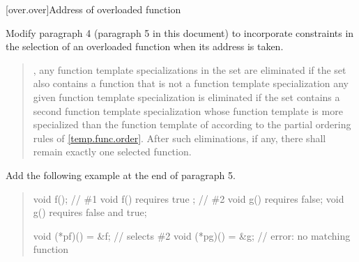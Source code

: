 [over.over]{Address of overloaded function}

Modify paragraph 4 (paragraph 5 in this document) to incorporate 
constraints in the selection of an overloaded function when its address is 
taken.

\begin{quote}
\setcounter{Paras}{3}
\pnum
{}
%
, 
any function template specializations in the set are eliminated if the 
set also contains a function that is not a function template
specialization
% 
%
 any given function template specialization
 is eliminated if the set contains a second function 
template specialization whose function template is more specialized than 
the function template of  according to the partial ordering 
rules of \ref{temp.func.order}.
%
After such eliminations, if any, there shall remain exactly one 
selected function.
\end{quote}

Add the following example at the end of paragraph 5.

\begin{quote}
\begin{addedblock}
\enterexample
\begin{codeblock}
void f();                // \#1
void f() requires true ; // \#2
void g() requires false;
void g() requires false and true;

void (*pf)() = &f;         // selects \#2
void (*pg)() = &g;         // error: no matching function
\end{codeblock}
\exitexample
\end{addedblock}
\end{quote}

